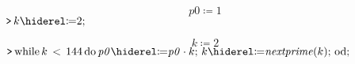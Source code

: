 \documentclass[11pt,a4paper,fleqn]{article}
\begin{document}
\begin{enumerate}[1.]
\begin{enumerate}[(a)]
\begin{flushleft}
\begin{mdframed}
                    \begin{dmath}\label{(1)}
                        \mathit{p0} \coloneqq 1
                    \end{dmath}
                    \mapleinput
                    {$ \displaystyle \texttt{>\,} k \coloneqq 2; $}

                    \begin{dmath}\label{(2)}
                        k \coloneqq 2
                    \end{dmath}
                    \mapleinput
                    {$ \displaystyle \texttt{>\,} \mathrm{while}\,k \,<\,144\,\mathrm{do} \,\mathit{p0} \coloneqq \mathit{p0} \cdot k ;
                        \\
                        \,k \coloneqq \mathit{nextprime} (k);
                        \\
                        \,\mathrm{od}; $}


\end{mdframed}
\end{flushleft}
\end{enumerate}
\end{enumerate}
\end{document}
